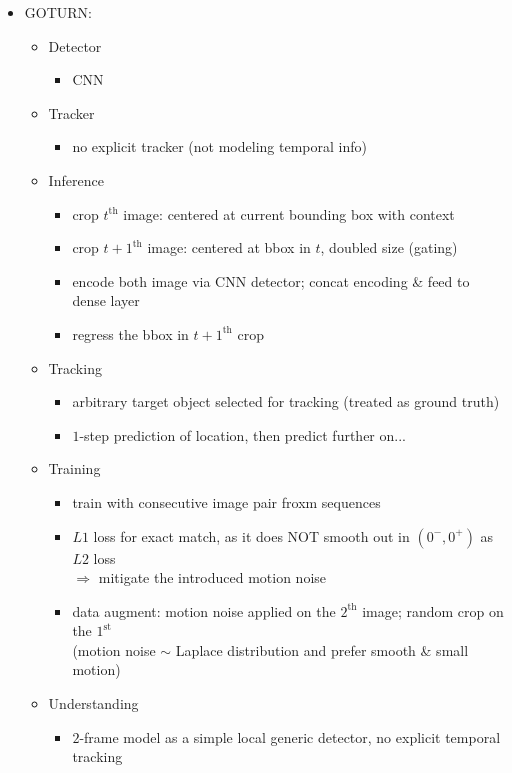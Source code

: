 \begin{itemize}
\item GOTURN: 
	\begin{itemize}
	\item Detector
		\begin{itemize}
		\item CNN
		\end{itemize}
	\item Tracker
		\begin{itemize}
		\item no explicit tracker (not modeling temporal info)
		\end{itemize}
	\item Inference
		\begin{itemize}
		\item crop $t^\text{th}$ image: centered at current bounding box with context
		\item crop $t+1^\text{th}$ image: centered at bbox in $t$, doubled size (gating)
		\item encode both image via CNN detector; concat encoding \& feed to dense layer
		\item regress the bbox in $t+1^\text{th}$ crop
		\end{itemize}
	\item Tracking
		\begin{itemize}
		\item arbitrary target object selected for tracking (treated as ground truth)
		\item $1$-step prediction of location, then predict further on...
		\end{itemize}
	\item Training
		\begin{itemize}
		\item train with consecutive image pair froxm sequences
		\item $L1$ loss for exact match, as it does NOT smooth out in $(0^-, 0^+)$ as $L2$ loss \\ 
		$\Rightarrow$ mitigate the introduced motion noise
		\item data augment: motion noise applied on the $2^\text{th}$ image; random crop on the $1^\text{st}$\\ 
		(motion noise $\sim$ Laplace distribution and prefer smooth \& small motion)
		\end{itemize}
	\item Understanding
		\begin{itemize}
		\item $2$-frame model as a simple local generic detector, no explicit temporal tracking \\

\end{itemize}
\end{itemize}
\end{itemize}
